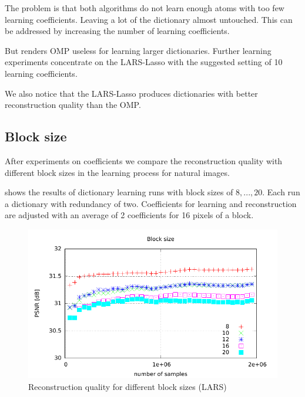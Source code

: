 The problem is that both algorithms do not learn enough atoms with too few
learning coefficients. Leaving a lot of the dictionary almost untouched. This
can be addressed by increasing the number of learning coefficients.

But renders OMP useless for learning larger dictionaries. Further learning
experiments concentrate on the LARS-Lasso with the suggested setting of 10
learning coefficients.


We also notice that the LARS-Lasso produces dictionaries with better
reconstruction quality than the OMP.



\newpage
\subsection{Block size}
After experiments on coefficients we compare the reconstruction quality
with different block sizes in the learning process for natural images. 

 shows the results of dictionary
learning runs with block sizes of $8,...,20$. 
Each run a dictionary with redundancy of two. Coefficients for learning
and reconstruction are adjusted with an average of 2 coefficients for 16 pixels
of a block.

\begin{figure}[h]
\centering
\includegraphics[width =
1.0\textwidth]{../tests/results/blockSizeConverg.pdf}
\caption{Reconstruction quality for different block sizes (LARS)}
\label{fig:blockSize}
\end{figure}

